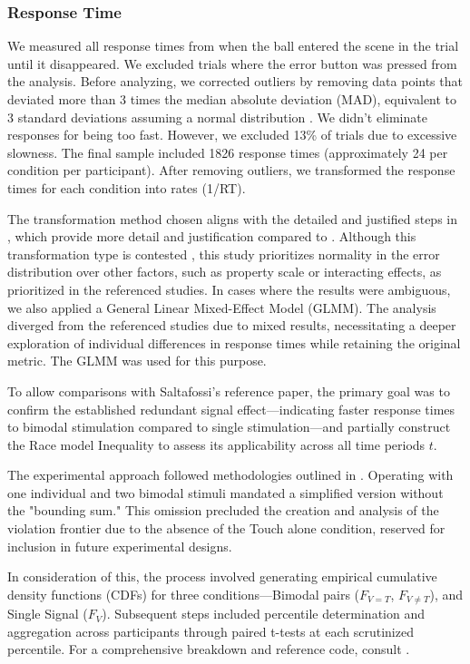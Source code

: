 \documentclass[12pt,oneside,openright]{report}
\begin{document}
\subsubsection*{Response Time}
We measured all response times from when the ball entered the scene in the trial until it disappeared. We excluded trials where the error button was pressed from the analysis. Before analyzing, we corrected outliers by removing data points that deviated more than 3 times the median absolute deviation (MAD), equivalent to 3 standard deviations assuming a normal distribution \parencite{Innes2019ACA}. We didn't eliminate responses for being too fast. However, we excluded 13\% of trials due to excessive slowness. The final sample included 1826 response times (approximately 24 per condition per participant). After removing outliers, we transformed the response times for each condition into rates (1/RT).

The transformation method chosen aligns with the detailed and justified steps in \cite{Innes2019ACA}, which provide more detail and justification compared to \cite{SALTAFOSSI2023108642}. Although this transformation type is contested \parencite{Lo2015-fv}, this study prioritizes normality in the error distribution over other factors, such as property scale or interacting effects, as prioritized in the referenced studies. In cases where the results were ambiguous, we also applied a General Linear Mixed-Effect Model (GLMM). The analysis diverged from the referenced studies due to mixed results, necessitating a deeper exploration of individual differences in response times while retaining the original metric. The GLMM was used for this purpose.

To allow comparisons with Saltafossi's reference paper, the primary goal was to confirm the established redundant signal effect—indicating faster response times to bimodal stimulation compared to single stimulation—and partially construct the Race model Inequality to assess its applicability across all time periods $t$.

The experimental approach followed methodologies outlined in \cite{Ulrich2007,Innes2019ACA}. Operating with one individual and two bimodal stimuli mandated a simplified version without the "bounding sum." This omission precluded the creation and analysis of the violation frontier due to the absence of the Touch alone condition, reserved for inclusion in future experimental designs.

In consideration of this, the process involved generating empirical cumulative density functions (CDFs) for three conditions—Bimodal pairs ($F_{V=T}$, $F_{V \neq T}$), and Single Signal ($F_V$). Subsequent steps included percentile determination and aggregation across participants through paired t-tests at each scrutinized percentile. For a comprehensive breakdown and reference code, consult \cite{Ulrich2007}.
\end{document}

